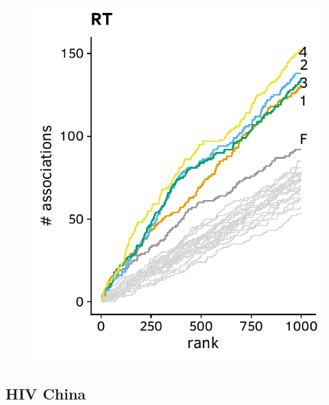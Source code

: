\documentclass[a4paper,11pt]{article}
\begin{document}
\begin{figure}[H]
    \begin{minipage}{.49\textwidth}
      \includegraphics[width=\linewidth]{plots/comparison_plots/arevir/rt_new_map.pdf}
    \end{minipage}
    \begin{minipage}{.49\textwidth}
    \end{minipage}
\end{figure}

\FloatBarrier
\subsection*{HIV China}
\end{document}
